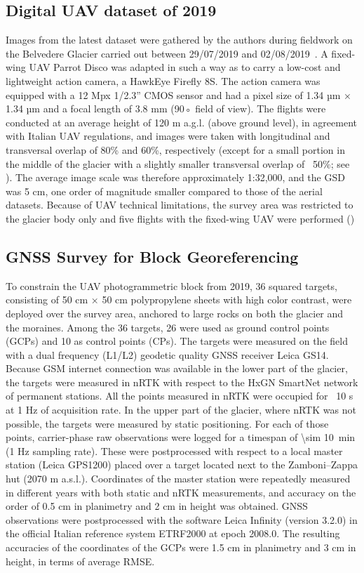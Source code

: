 \subsection{Digital UAV dataset of 2019}

Images from the latest dataset were gathered by the authors during fieldwork on the
Belvedere Glacier carried out between 29/07/2019 and 02/08/2019~\citep{Ioli2022}. 
A fixed-wing UAV Parrot Disco was adapted in such a way as to carry a low-cost and lightweight action
camera, a HawkEye Firefly 8S. 
The action camera was equipped with a 12 Mpx 1/2.3” CMOS sensor and had a pixel size of 1.34 µm × 1.34 µm and a focal length of 3.8 mm (90◦ field of view). 
The flights were conducted at an average height of 120 m a.g.l. (above ground level), in agreement with Italian UAV regulations, and images were taken with longitudinal and transversal overlap of 80\% and 60\%, respectively (except for a small portion in the middle of the glacier with a slightly smaller transversal overlap of ~50\%; see ).
The average image scale was therefore approximately 1:32,000, and the GSD was 5 cm, one order of magnitude smaller compared to those of the aerial datasets. 
Because of UAV technical limitations, the survey area was restricted to the glacier body only and five flights with the fixed-wing UAV were performed ()


\subsection{GNSS Survey for Block Georeferencing}

To constrain the UAV photogrammetric block from 2019, 36 squared targets, consisting
of 50 cm × 50 cm polypropylene sheets with high color contrast, were deployed over the
survey area, anchored to large rocks on both the glacier and the moraines. Among the
36 targets, 26 were used as ground control points (GCPs) and 10 as control points (CPs).
The targets were measured on the field with a dual frequency (L1/L2) geodetic quality
GNSS receiver Leica GS14. Because GSM internet connection was available in the lower
part of the glacier, the targets were measured in nRTK with respect to the HxGN SmartNet
network of permanent stations. All the points measured in nRTK were occupied for ~10 s
at 1 Hz of acquisition rate. In the upper part of the glacier, where nRTK was not possible,
the targets were measured by static positioning. For each of those points, carrier-phase
raw observations were logged for a timespan of \SI{\sim 10}{\minute} (1 Hz sampling rate).
These were postprocessed with respect to a local master station (Leica GPS1200) placed 
over a target located next to the Zamboni–Zappa hut (2070 m a.s.l.). 
Coordinates of the master station were repeatedly measured in different years with both
static and nRTK measurements, and accuracy on the order of 0.5 cm in planimetry and 2 cm 
in height was obtained. 
GNSS observations were postprocessed with the software Leica Infinity (version 3.2.0) in the
official Italian reference system ETRF2000 at epoch 2008.0. The resulting accuracies of
the coordinates of the GCPs were 1.5 cm in planimetry and 3 cm in height, in terms of
average RMSE.

